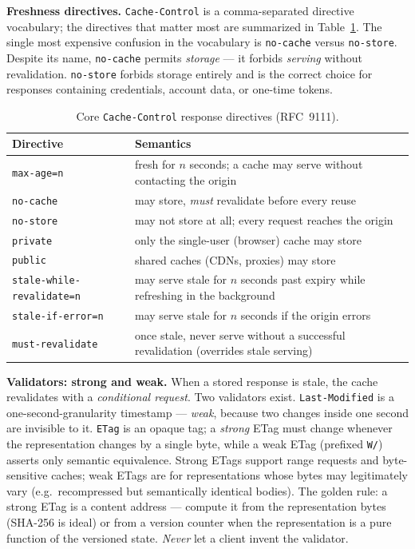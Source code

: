 \textbf{Freshness directives.} \texttt{Cache-Control} is a comma-separated
directive vocabulary; the directives that matter most are summarized in
Table~\ref{tab:ch10-directives}. The single most expensive confusion in the
vocabulary is \texttt{no-cache} versus \texttt{no-store}. Despite its name,
\texttt{no-cache} permits \emph{storage} --- it forbids \emph{serving}
without revalidation. \texttt{no-store} forbids storage entirely and is the
correct choice for responses containing credentials, account data, or
one-time tokens.

\begin{table}[h]
  \centering
  \small
  \begin{tabularx}{\textwidth}{l X}
    \toprule
    \textbf{Directive} & \textbf{Semantics} \\
    \midrule
    \texttt{max-age=n} & fresh for $n$ seconds; a cache may serve without contacting the origin \\
    \texttt{no-cache} & may store, \emph{must} revalidate before every reuse \\
    \texttt{no-store} & may not store at all; every request reaches the origin \\
    \texttt{private} & only the single-user (browser) cache may store \\
    \texttt{public} & shared caches (CDNs, proxies) may store \\
    \texttt{stale-while-revalidate=n} & may serve stale for $n$ seconds past expiry while refreshing in the background \\
    \texttt{stale-if-error=n} & may serve stale for $n$ seconds if the origin errors \\
    \texttt{must-revalidate} & once stale, never serve without a successful revalidation (overrides stale serving) \\
    \bottomrule
  \end{tabularx}
  \caption{Core \texttt{Cache-Control} response directives (RFC~9111).}
  \label{tab:ch10-directives}
\end{table}

\textbf{Validators: strong and weak.} When a stored response is stale, the
cache revalidates with a \emph{conditional request}. Two validators exist.
\texttt{Last-Modified} is a one-second-granularity timestamp ---
\emph{weak}, because two changes inside one second are invisible to it.
\texttt{ETag} is an opaque tag; a \emph{strong} ETag must change whenever
the representation changes by a single byte, while a weak ETag (prefixed
\texttt{W/}) asserts only semantic equivalence. Strong ETags support range
requests and byte-sensitive caches; weak ETags are for representations whose
bytes may legitimately vary (e.g.\ recompressed but semantically identical
bodies). The golden rule: a strong ETag is a content address --- compute it
from the representation bytes (SHA-256 is ideal) or from a version counter
when the representation is a pure function of the versioned state.
\emph{Never} let a client invent the validator.


